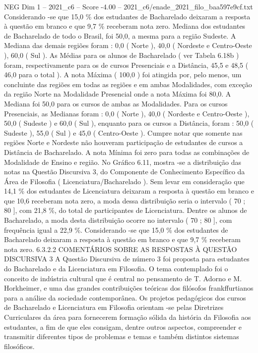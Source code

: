 \begin{textsample}{NEG Dim 1 – 2021\_c6 – Score -4.00 – 2021\_c6/enade\_2021\_filo\_baa597e9cf.txt}
Considerando -se que 15,0 \% dos estudantes de Bacharelado deixaram a resposta à questão em branco e que 9,7 \% receberam nota zero.
Mediana dos estudantes de Bacharelado de todo o Brasil, foi 50,0, a mesma para a região Sudeste.
A Mediana das demais regiões foram : 0,0 ( Norte ), 40,0 ( Nordeste e Centro-Oeste ), 60,0 ( Sul ).
As Médias para os alunos de Bacharelado ( ver Tabela 6.18b ) foram, respectivamente para os de cursos Presenciais e a Distância, 45,5 e 48,5 ( 46,0 para o total ).
A nota Máxima ( 100,0 ) foi atingida por, pelo menos, um concluinte das regiões em todas as regiões e em ambas Modalidades, com exceção da região Norte na Modalidade Presencial onde a nota Máxima foi 80,0.
A Mediana foi 50,0 para os cursos de ambas as Modalidades.
Para os cursos Presenciais, as Medianas foram : 0,0 ( Norte ), 40,0 ( Nordeste e Centro-Oeste ), 50,0 ( Sudeste ) e 60,0 ( Sul ), enquanto para os cursos a Distância, foram : 50,0 ( Sudeste ), 55,0 ( Sul ) e 45,0 ( Centro-Oeste ).
Cumpre notar que somente nas regiões Norte e Nordeste não houveram participação de estudantes de cursos a Distância de Bacharelado.
A nota Mínima foi zero para todas as combinações de Modalidade de Ensino e região.
No Gráfico 6.11, mostra -se a distribuição das notas na Questão Discursiva 3, do Componente de Conhecimento Específico da Área de Filosofia ( Licenciatura/Bacharelado ).
Sem levar em consideração que 14,1 \% dos estudantes de Licenciatura deixaram a resposta à questão em branco e que 10,6 receberam nota zero, a moda dessa distribuição seria o intervalo ( 70 ; 80 ], com 21,8 \%, do total de participantes de Licenciatura.
Dentre os alunos de Bacharelado, a moda desta distribuição ocorre no intervalo ( 70 ; 80 ], com frequência igual a 22,9 \%.
Considerando -se que 15,0 \% dos estudantes de Bacharelado deixaram a resposta à questão em branco e que 9,7 \% receberam nota zero. 6.3.2.2 COMENTÁRIOS SOBRE AS RESPOSTAS À QUESTÃO DISCURSIVA 3 A Questão Discursiva de número 3 foi proposta para estudantes do Bacharelado e da Licenciatura em Filosofia.
O tema contemplado foi o conceito de indústria cultural que é central no pensamento de T.
Adorno e M.
Horkheimer, e uma das grandes contribuições teóricas dos filósofos frankffurtianos para a análise da sociedade contemporânea.
Os projetos pedagógicos dos cursos de Bacharelado e Licenciatura em Filosofia orientam -se pelas Diretrizes Curriculares da área para fornecerem formação sólida da história da Filosofia aos estudantes, a fim de que eles consigam, dentre outros aspectos, compreender e transmitir diferentes tipos de problemas e temas e também distintos sistemas filosóficos.

\end{textsample}
